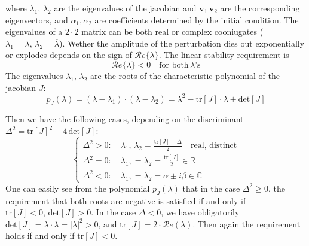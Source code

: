 where $\lambda_1,\, \lambda_2$ are the eigenvalues of the jacobian and $\mathbf{v}_1\, \mathbf{v}_2$ are the corresponding eigenvectors, and $\alpha_1, \alpha_2$ are coefficients determined by the initial condition. The eigenvalues of a $2\cdot 2$ matrix can be both real or complex cooniugates ($\lambda_1 = \lambda, \, \lambda_2 = \overline{\lambda}$). Wether the amplitude of the perturbation dies out exponentially or explodes depends on the sign of $\mathcal{R}e\{\lambda\}$. The linear stability requirement is
$$
\mathcal{R}e\{\lambda\} <0 \quad \text{for both} \, \lambda\text{'s}
$$
The eigenvalues $\lambda_1,\, \lambda_2$ are the roots of the characteristic polynomial of the jacobian $J$:
\begin{equation*}
    p_J(\lambda) = (\lambda - \lambda_1)\cdot (\lambda - \lambda_2) = \lambda^2 - \text{tr}[J]\cdot\lambda + \text{det}[J]
\end{equation*}
\begin{minipage}{0.5\textwidth}
Then we have the following cases, depending on the discriminant $\Delta^2 = \text{tr}[J]^2 - 4\,\text{det}[J]$:
\begin{equation*}
    \begin{cases}
        \Delta^2 > 0: \quad \lambda_1,\, \lambda_2  =  \frac{\text{tr}[J] \pm \Delta }{2} \quad \text{real, distinct} \\
        \Delta^2 = 0: \quad \lambda_1,= \lambda_2 = \frac{\text{tr}[J]}{2} \in \mathbb{R} \\
        \Delta^2 <0: \quad \lambda_1,= \lambda_2  = \alpha \pm i \beta \in \mathbb{C}
    \end{cases}
\end{equation*}
One can easily see from the polynomial $p_J(\lambda)$ that in the case $\Delta^2 \geq 0$, the requirement that both roots are negative is satisfied if and only if $\text{tr}[J]<0,\, \text{det}[J] >0$. In the case $\Delta <0$, we have obligatorily $\text{det}[J] = \lambda \cdot \overline{\lambda} = |\lambda|^2 >0$, and $\text{tr}[J]= 2\cdot \mathcal{R}e(\lambda)$. Then again the requirement holds if and only if $\text{tr}[J]< 0$.
\end{minipage}
\hfill
{}
